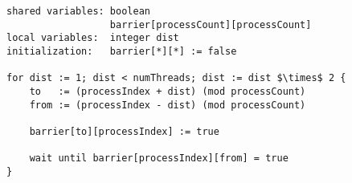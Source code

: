 \begin{lstlisting}[mathescape]
shared variables: boolean
                  barrier[processCount][processCount]
local variables:  integer dist
initialization:   barrier[*][*] := false

for dist := 1; dist < numThreads; dist := dist $\times$ 2 {
	to   := (processIndex + dist) (mod processCount)
	from := (processIndex - dist) (mod processCount)
	
	barrier[to][processIndex] := true
	
	wait until barrier[processIndex][from] = true
}
\end{lstlisting}

